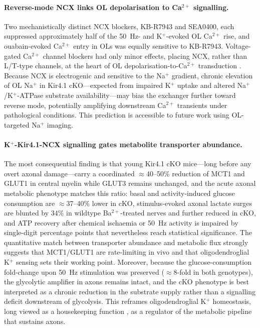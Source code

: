 \documentclass[11pt,a4paper]{article}
\begin{document}
\paragraph{Reverse-mode NCX links OL depolarisation to Ca$^{2+}$ signalling.} Two mechanistically distinct NCX blockers, KB-R7943 and SEA0400, each suppressed approximately half of the 50~Hz- and K$^+$-evoked OL Ca$^{2+}$ rise, and ouabain-evoked Ca$^{2+}$ entry in OLs was equally sensitive to KB-R7943. Voltage-gated Ca$^{2+}$ channel blockers had only minor effects, placing NCX, rather than L/T-type channels, at the heart of OL depolarisation-to-Ca$^{2+}$ transduction \citep{Stys1992,Micu2018}. Because NCX is electrogenic and sensitive to the Na$^+$ gradient, chronic elevation of OL Na$^+$ in Kir4.1 cKO---expected from impaired K$^+$ uptake and altered Na$^+$/K$^+$-ATPase substrate availability---may bias the exchanger further toward reverse mode, potentially amplifying downstream Ca$^{2+}$ transients under pathological conditions. This prediction is accessible to future work using OL-targeted Na$^+$ imaging.

\paragraph{K$^+$-Kir4.1-NCX signalling gates metabolite transporter abundance.} The most consequential finding is that young Kir4.1 cKO mice---long before any overt axonal damage---carry a coordinated $\approx$40--50\% reduction of MCT1 and GLUT1 in central myelin while GLUT3 remains unchanged, and the acute axonal metabolic phenotype matches this ratio: basal and activity-induced glucose consumption are $\approx$37--40\% lower in cKO, stimulus-evoked axonal lactate surges are blunted by $34\%$ in wildtype Ba$^{2+}$-treated nerves and further reduced in cKO, and ATP recovery after chemical ischaemia or 50~Hz activity is impaired by single-digit percentage points that nevertheless reach statistical significance. The quantitative match between transporter abundance and metabolic flux strongly suggests that MCT1/GLUT1 are rate-limiting in vivo and that oligodendroglial K$^+$ sensing sets their working point. Moreover, because the glucose-consumption fold-change upon 50~Hz stimulation was preserved ($\approx$8-fold in both genotypes), the glycolytic amplifier in axons remains intact, and the cKO phenotype is best interpreted as a chronic reduction in the substrate supply rather than a signalling deficit downstream of glycolysis. This reframes oligodendroglial K$^+$ homeostasis, long viewed as a housekeeping function \citep{Olsen2015,Hawkins2017}, as a regulator of the metabolic pipeline that sustains axons.
\end{document}
